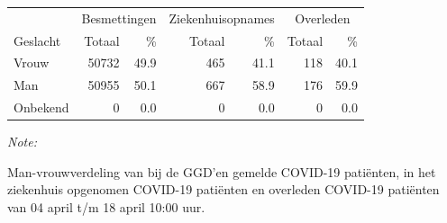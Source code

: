 \documentclass[
  english,
  man,floatsintext]{apa6}
\begin{document}
\begin{table}
\centering\begingroup\fontsize{11}{13}\selectfont

\begin{threeparttable}
\begin{tabular}{lrrrrrr}
\toprule
\multicolumn{1}{c}{ } & \multicolumn{2}{c}{Besmettingen} & \multicolumn{2}{c}{Ziekenhuisopnames} & \multicolumn{2}{c}{Overleden} \\
\cmidrule(l{3pt}r{3pt}){2-3} \cmidrule(l{3pt}r{3pt}){4-5} \cmidrule(l{3pt}r{3pt}){6-7}
Geslacht & Totaal & \% & Totaal & \% & Totaal & \%\\
\midrule
Vrouw & 50732 & 49.9 & 465 & 41.1 & 118 & 40.1\\
Man & 50955 & 50.1 & 667 & 58.9 & 176 & 59.9\\
Onbekend & 0 & 0.0 & 0 & 0.0 & 0 & 0.0\\
\bottomrule
\end{tabular}
\begin{tablenotes}
\item \textit{Note: } 
\item Man-vrouwverdeling van bij de GGD’en gemelde COVID-19 patiënten, in het ziekenhuis opgenomen COVID-19 patiënten en overleden COVID-19 patiënten van 04 april t/m 18 april 10:00 uur.
\end{tablenotes}
\end{threeparttable}
\endgroup{}
\end{table}
\newpage
\end{document}
